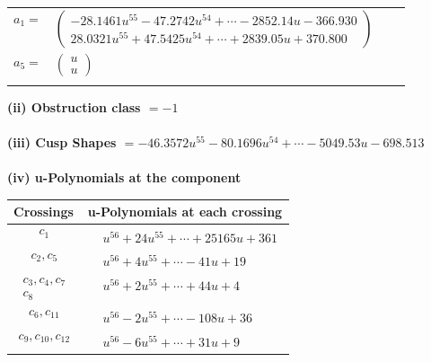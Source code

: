 \documentclass[1p]{elsarticle_modified}
\theoremstyle{definition}
\begin{document}
\begin{tabular}{m{7pt} m{180pt} m{7pt} m{180pt} }
\flushright $a_{1}=$&$\begin{pmatrix}-28.1461 u^{55}-47.2742 u^{54}+\cdots-2852.14 u-366.930\\28.0321 u^{55}+47.5425 u^{54}+\cdots+2839.05 u+370.800\end{pmatrix}$ \\
\flushright $a_{5}=$&$\begin{pmatrix}u\\u\end{pmatrix}$\\&\end{tabular}
\flushleft \textbf{(ii) Obstruction class $= -1$}\\~\\
\flushleft \textbf{(iii) Cusp Shapes $= -46.3572 u^{55}-80.1696 u^{54}+\cdots-5049.53 u-698.513$}\\~\\
\newpage\renewcommand{\arraystretch}{1}
\flushleft \textbf{(iv) u-Polynomials at the component}\newline \\
\begin{tabular}{m{50pt}|m{274pt}}
Crossings & \hspace{64pt}u-Polynomials at each crossing \\
\hline $$\begin{aligned}c_{1}\end{aligned}$$&$\begin{aligned}
&u^{56}+24 u^{55}+\cdots+25165 u+361
\end{aligned}$\\
\hline $$\begin{aligned}c_{2},c_{5}\end{aligned}$$&$\begin{aligned}
&u^{56}+4 u^{55}+\cdots-41 u+19
\end{aligned}$\\
\hline $$\begin{aligned}c_{3},c_{4},c_{7}\\c_{8}\end{aligned}$$&$\begin{aligned}
&u^{56}+2 u^{55}+\cdots+44 u+4
\end{aligned}$\\
\hline $$\begin{aligned}c_{6},c_{11}\end{aligned}$$&$\begin{aligned}
&u^{56}-2 u^{55}+\cdots-108 u+36
\end{aligned}$\\
\hline $$\begin{aligned}c_{9},c_{10},c_{12}\end{aligned}$$&$\begin{aligned}
&u^{56}-6 u^{55}+\cdots+31 u+9
\end{aligned}$\\
\hline
\end{tabular}\\~\\
\end{document}
